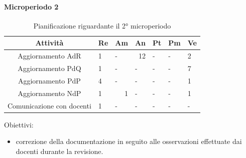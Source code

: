 \paragraph{Microperiodo 2}
\begin{table}[H]
	\centering
	\renewcommand{\arraystretch}{1.5}
	\begin{tabular}{|c|p{10mm}|p{10mm}|p{10mm}|p{10mm}|p{10mm}|p{10mm}|}
		\hline
		\rowcolor{lighter-grayer}
		\textbf{Attività}                         & \textbf{Re} & \textbf{Am} & \textbf{An} & \textbf{Pt} & \textbf{Pm} & \textbf{Ve} \\ \hline
		
		Aggiornamento AdR                       & 1                                & -                                & \multicolumn{1}{r|}{12}          & -                                & -                                & 2                                \\ \hline
		Aggiornamento PdQ                       & 1                                & -                                & -                                & -                                & -                                & 7                                \\ \hline
		Aggiornamento PdP                       & 4                                & -                                & -                                & -                                & -                                & 1                                \\ \hline
		Aggiornamento NdP                       & 1                                & \multicolumn{1}{r|}{1}           & -                                & -                                & -                                & 1                                \\ \hline
		Comunicazione con docenti               & 1                                & -                                & -                                & -                                & -                                & \multicolumn{1}{l|}{-}           \\ \hline
		
	\end{tabular}
	\caption{ Pianificazione riguardante il 2° microperiodo\\}
\end{table}

Obiettivi:
\begin{itemize}
	\item correzione della documentazione in seguito alle osservazioni effettuate dai docenti durante la revisione. 
\end{itemize}

